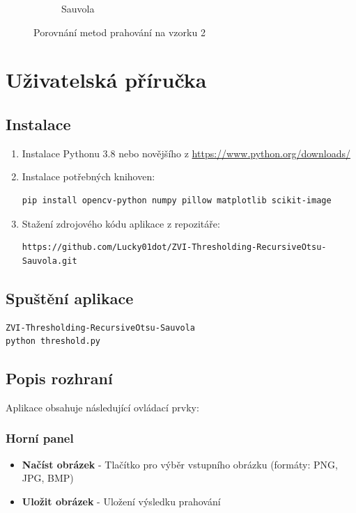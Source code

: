 \documentclass[12pt,a4paper]{article}
\begin{document}
\begin{figure}[h!]
\begin{subfigure}[b]{0.3\textwidth}
        \caption{Sauvola}
    \end{subfigure}
    \caption{Porovnání metod prahování na vzorku 2}
\end{figure}




\section{Uživatelská příručka}

\subsection{Instalace}
\begin{enumerate}
\item Instalace Pythonu 3.8 nebo novějšího z \url{https://www.python.org/downloads/}
\item Instalace potřebných knihoven:
\begin{verbatim}
pip install opencv-python numpy pillow matplotlib scikit-image
\end{verbatim}
\item Stažení zdrojového kódu aplikace z repozitáře:
\begin{verbatim}
https://github.com/Lucky01dot/ZVI-Thresholding-RecursiveOtsu-Sauvola.git
\end{verbatim}
\end{enumerate}

\subsection{Spuštění aplikace}
\begin{verbatim}
ZVI-Thresholding-RecursiveOtsu-Sauvola
python threshold.py
\end{verbatim}

\subsection{Popis rozhraní}


Aplikace obsahuje následující ovládací prvky:

\subsubsection{Horní panel}
\begin{itemize}
\item \textbf{Načíst obrázek} - Tlačítko pro výběr vstupního obrázku (formáty: PNG, JPG, BMP)
\item \textbf{Uložit obrázek} - Uložení výsledku prahování
\end{itemize}
\end{document}
